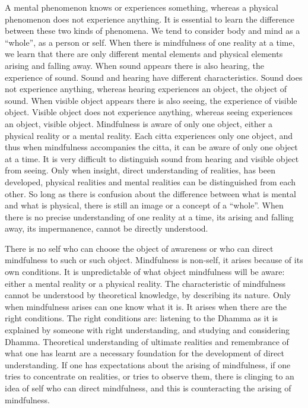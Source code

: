 \documentclass{book}
\begin{document}
A mental phenomenon knows or experiences something, whereas a physical
phenomenon does not experience anything. It is essential to learn the
difference between these two kinds of phenomena. We tend to consider
body and mind as a ``whole'', as a person or self. When there is
mindful­ness of one reality at a time, we learn that there are only
different mental elements and physical elements arising and falling
away. When sound appears there is also hearing, the experience of sound.
Sound and hearing have different characteristics. Sound does not
experience any­thing, whereas hearing experiences an object, the object
of sound. When visible object appears there is also seeing, the
experience of visible object. Visible object does not experience
anything, whereas seeing experiences an object, visible object. 
Mindfulness is aware of only one object, either a physical reality 
or a mental reality. Each citta experiences only one object, and
thus when mindfulness accompanies the citta, it can be aware of only one
object at a time. It is very difficult to distinguish sound from hearing
and visible object from seeing. Only when insight, direct understanding
of realities, has been developed, physical realities and mental
realities can be distinguished from each other. So long as there is
confusion about the difference between what is mental and what is
physical, there is still an image or a concept of a ``whole''. When
there is no precise under­standing of one reality at a time, its arising
and falling away, its impermanence, cannot be directly understood.

There is no self who can choose the object of awareness or who can
direct mindfulness to such or such object. Mindfulness is non-self, it
arises because of its own condi­tions. It is unpredictable of what
object mindfulness will be aware: either a mental reality or a physical
reality. The characteristic of mindfulness cannot be understood by
theoretical knowledge, by describing its nature. Only when mindfulness
arises can one know what it is. It arises when there are the right
conditions. The right conditions are: listening to the Dhamma as it is
explained by someone with right understanding, and studying and
considering Dhamma. Theoretical understanding of ultimate realities and
remembrance of what one has learnt are a necessary foundation for the
development of direct understanding. If one has expectations about the
arising of mindfulness, if one tries to concentrate on realities, or
tries to observe them, there is clinging to an idea of self who can
direct mindfulness, and this is counteracting the arising of
mindfulness.
\end{document}
